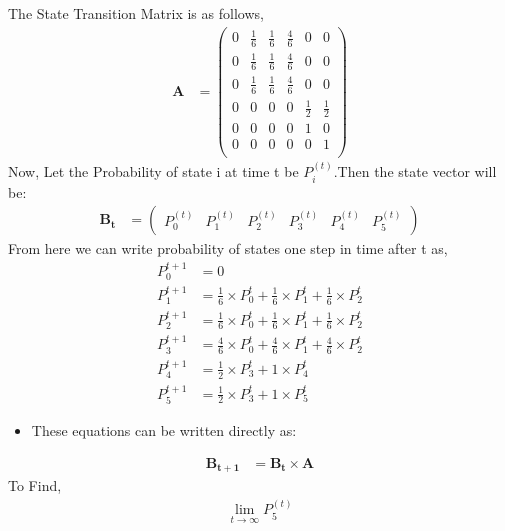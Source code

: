 \documentclass[journal,12pt,onecolumn]{IEEEtran}
\begin{document}
The State Transition Matrix is as follows,
\begin{align}
\textbf{A} &= 
\begin{pmatrix}
 0 & \frac{1}{6} & \frac{1}{6} & \frac{4}{6} & 0 & 0 \\[4pt] 
 0 & \frac{1}{6} & \frac{1}{6} & \frac{4}{6} & 0 & 0 \\[4pt]
 0 & \frac{1}{6} & \frac{1}{6} & \frac{4}{6} & 0 & 0 \\[4pt]
 0 & 0 & 0 & 0 & \frac{1}{2} & \frac{1}{2} \\[4pt]
 0 & 0 & 0 & 0 & 1 & 0 \\[4pt]
 0 & 0 & 0 & 0 & 0 & 1 \\[4pt]
\end{pmatrix}
\end{align}
Now, Let the Probability of state i at time t be $P_{i}^{(t)}$.Then the state vector will be: 
\begin{align}
\label{eq:5}
\mathbf{B_{t}} &= 
\begin{pmatrix}
P_{0}^{(t)} & P_{1}^{(t)} & P_{2}^{(t)} & P_{3}^{(t)} & P_{4}^{(t)} & P_{5}^{(t)}
\end{pmatrix}
\end{align}
From here we can write probability of states one step in time after t as,
\begin{align}
    P_{0}^{t+1} &= 0 \\
    P_{1}^{t+1} &= \frac{1}{6} \times P_{0}^{t} + \frac{1}{6} \times P_{1}^{t} + \frac{1}{6} \times P_{2}^{t} \\ 
    P_{2}^{t+1} &=  \frac{1}{6} \times P_{0}^{t} + \frac{1}{6} \times P_{1}^{t} + \frac{1}{6} \times P_{2}^{t}\\
    P_{3}^{t+1} &= \frac{4}{6} \times P_{0}^{t} + \frac{4}{6} \times P_{1}^{t} + \frac{4}{6} \times P_{2}^{t}  \\
    P_{4}^{t+1} &= \frac{1}{2} \times P_{3}^{t} + 1 \times P_{4}^{t}   \\
    P_{5}^{t+1} &= \frac{1}{2} \times P_{3}^{t} + 1 \times P_{5}^{t}  
\end{align}
\begin{itemize}
    \item These equations can be written directly as:
\end{itemize}
\begin{align}
   \label{1}
    \mathbf{B_{t+1}} &= \mathbf{B_{t}} \times \mathbf{A}
\end{align}
To Find,
\begin{align}
    \lim_{t \to \infty} P_{5}^{(t)}
\end{align}
\end{document}
